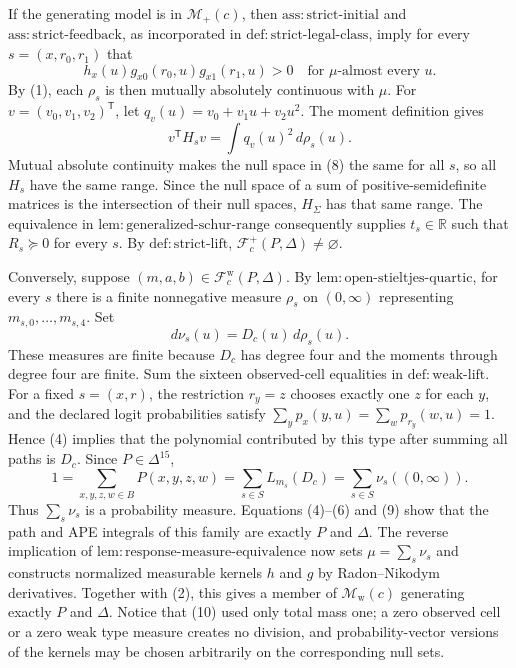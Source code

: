 If the generating model is in \(\mathcal M_+(c)\), then \(\mathrm{ass{:}strict\text{-}initial}\) and \(\mathrm{ass{:}strict\text{-}feedback}\), as incorporated in \(\mathrm{def{:}strict\text{-}legal\text{-}class}\), imply for every \(s=(x,r_0,r_1)\) that
\[
 h_x(u)g_{x0}(r_0,u)g_{x1}(r_1,u)>0
 \quad\text{for }\mu\text{-almost every }u. \tag{7}
\]
By (1), each \(\rho_s\) is then mutually absolutely continuous with \(\mu\).  For \(v=(v_0,v_1,v_2)^{\mathsf T}\), let \(q_v(u)=v_0+v_1u+v_2u^2\).  The moment definition gives
\[
 v^{\mathsf T}H_sv=\int q_v(u)^2\,d\rho_s(u). \tag{8}
\]
Mutual absolute continuity makes the null space in (8) the same for all \(s\), so all \(H_s\) have the same range.  Since the null space of a sum of positive-semidefinite matrices is the intersection of their null spaces, \(H_\Sigma\) has that same range.  The equivalence in \(\mathrm{lem{:}generalized\text{-}schur\text{-}range}\) consequently supplies \(t_s\in\mathbb R\) such that \(R_s\succeq0\) for every \(s\).  By \(\mathrm{def{:}strict\text{-}lift}\), \(\mathcal F_c^+(P,\Delta)\ne\varnothing\).

Conversely, suppose \((m,a,b)\in\mathcal F_c^{\mathrm w}(P,\Delta)\).  By \(\mathrm{lem{:}open\text{-}stieltjes\text{-}quartic}\), for every \(s\) there is a finite nonnegative measure \(\rho_s\) on \((0,\infty)\) representing \(m_{s,0},\ldots,m_{s,4}\).  Set
\[
 d\nu_s(u)=D_c(u)\,d\rho_s(u). \tag{9}
\]
These measures are finite because \(D_c\) has degree four and the moments through degree four are finite.  Sum the sixteen observed-cell equalities in \(\mathrm{def{:}weak\text{-}lift}\).  For a fixed \(s=(x,r)\), the restriction \(r_y=z\) chooses exactly one \(z\) for each \(y\), and the declared logit probabilities satisfy \(\sum_y p_x(y,u)=\sum_w p_{r_y}(w,u)=1\).  Hence (4) implies that the polynomial contributed by this type after summing all paths is \(D_c\).  Since \(P\in\Delta^{15}\),
\[
 1=\sum_{x,y,z,w\in B}P(x,y,z,w)
 =\sum_{s\in S}L_{m_s}(D_c)
 =\sum_{s\in S}\nu_s((0,\infty)). \tag{10}
\]
Thus \(\sum_s\nu_s\) is a probability measure.  Equations (4)--(6) and (9) show that the path and APE integrals of this family are exactly \(P\) and \(\Delta\).  The reverse implication of \(\mathrm{lem{:}response\text{-}measure\text{-}equivalence}\) now sets \(\mu=\sum_s\nu_s\) and constructs normalized measurable kernels \(h\) and \(g\) by Radon--Nikodym derivatives.  Together with (2), this gives a member of \(\mathcal M_{\mathrm w}(c)\) generating exactly \(P\) and \(\Delta\).  Notice that (10) used only total mass one; a zero observed cell or a zero weak type measure creates no division, and probability-vector versions of the kernels may be chosen arbitrarily on the corresponding null sets.

